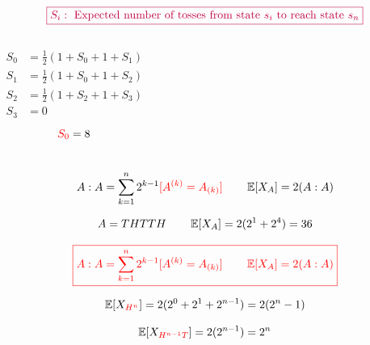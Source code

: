 \begin{frame}{}

  \pause
  \vspace{-0.30cm}
  \[
    \textcolor{purple}{\boxed{S_i: \text{ Expected number of tosses from state $s_i$ to reach state } s_n}}
  \]

  \begin{columns}
      \pause
      \begin{align*}
	S_0 &= \frac{1}{2}(1 + S_0 + 1 + S_1) \\
	S_1 &= \frac{1}{2}(1 + S_0 + 1 + S_2) \\
	S_2 &= \frac{1}{2}(1 + S_2 + 1 + S_3) \\
	S_3 &= 0
      \end{align*}
      \pause
      \[
	\textcolor{red}{S_0} = 8
      \]
  \end{columns}
\end{frame}

\begin{frame}{}


\end{frame}

\begin{frame}{}
  \[
    A : A = \sum_{k=1}^{n} 2^{k-1} \textcolor{red}{[A^{(k)} = A_{(k)}]} \qquad \operatorname*{\mathbb{E}}[X_{A}] = 2 (A : A)
  \]

  \pause
  \vspace{-0.30cm}

  \pause
  \[
    A = THTTH \qquad \operatorname*{\mathbb{E}}[X_A] = 2(2^1 + 2^4) = 36
  \]

\end{frame}

\begin{frame}{}
  \[
    \textcolor{red}{\boxed{A : A = \sum_{k=1}^{n} 2^{k-1} [A^{(k)} = A_{(k)}] \qquad \operatorname*{\mathbb{E}}[X_{A}] = 2 (A : A)}}
  \]

  \pause
  \vspace{0.30cm}
  \[
    \operatorname*{\mathbb{E}}[X_{\textcolor{red}{H^n}}] = 2(2^0 + 2^1 + 2^{n-1}) = 2(2^n - 1)
  \]

  \pause
  \vspace{0.30cm}
  \[
    \operatorname*{\mathbb{E}}[X_{\textcolor{red}{H^{n-1} T}}] = 2(2^{n-1}) = 2^n
  \]
\end{frame}

